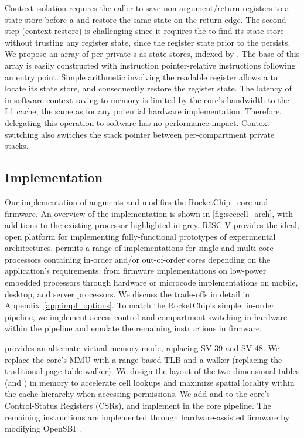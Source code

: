 Context isolation requires the caller to save non-argument/return
registers to a state store before a \sdswitch and restore the same state
on the return edge.
The second step (context restore) is challenging since it
requires the \secdiv to find its state store without trusting any
register state, since the register state prior to the \sdswitch
persists.
We propose an array of per-\secdiv private \cell{}s as 
state stores, indexed by \sid.
The base of this array is easily constructed with
instruction pointer-relative instructions following an entry point.
Simple arithmetic involving the readable \sid register allows
a \secdiv to locate its state store, and consequently restore
the register state.
The latency of in-software context saving to memory is limited by 
the core's bandwidth to the L1 cache, the same as for any potential
hardware implementation.
Therefore, delegating this operation to software has no performance
impact.
Context switching also switches the stack pointer between 
per-compartment private stacks.

\subsection{Implementation}
\label{sec:seccells:impl}

Our implementation of \seccells augments and modifies the 
RocketChip~\cite{RocketChip} core and firmware.
An overview of the implementation is shown in 
\autoref{fig:seccell_arch}, with additions to the existing
processor highlighted in grey.
RISC-V provides the ideal, open platform for implementing fully-functional
prototypes of experimental architectures. 
\seccells permits a range of implementations for single and multi-core
processors containing in-order and/or out-of-order cores depending on the 
application's requirements: from firmware implementations on 
low-power embedded processors through hardware or 
microcode implementations on mobile, desktop, and server processors.
We discuss the trade-offs in detail in Appendix~\ref{app:impl_options}.
To match the RocketChip's simple, in-order pipeline, we implement 
access control and compartment switching in hardware within the pipeline 
and emulate the remaining instructions in firmware.

\seccells provides an alternate virtual memory mode, replacing 
SV-39 and SV-48.
We replace the core's MMU with a range-based TLB and a 
\ptable walker (replacing the traditional page-table walker).
We design the layout of the two-dimensional tables (\ptable and \gtable)
in memory to accelerate cell lookups and maximize 
spatial locality within the cache hierarchy when accessing permissions.
We add \sid and \rid to the core's Control-Status Registers (CSRs), 
and implement \sdswitch in the core pipeline.
The remaining instructions are implemented through hardware-assisted firmware 
by modifying OpenSBI~\cite{OpenSBI}.

